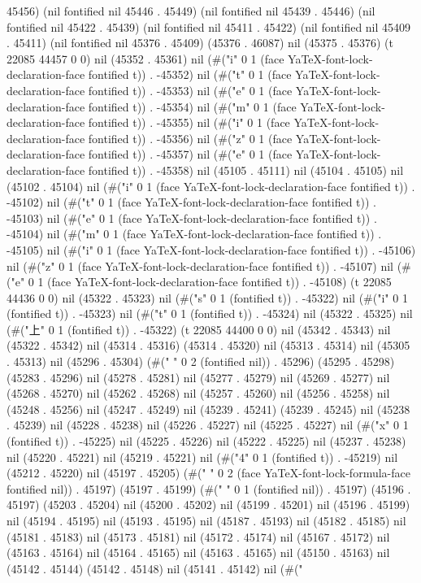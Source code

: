 45456) (nil fontified nil 45446 . 45449) (nil fontified nil 45439 . 45446) (nil fontified nil 45422 . 45439) (nil fontified nil 45411 . 45422) (nil fontified nil 45409 . 45411) (nil fontified nil 45376 . 45409) (45376 . 46087) nil (45375 . 45376) (t 22085 44457 0 0) nil (45352 . 45361) nil (#("i" 0 1 (face YaTeX-font-lock-declaration-face fontified t)) . -45352) nil (#("t" 0 1 (face YaTeX-font-lock-declaration-face fontified t)) . -45353) nil (#("e" 0 1 (face YaTeX-font-lock-declaration-face fontified t)) . -45354) nil (#("m" 0 1 (face YaTeX-font-lock-declaration-face fontified t)) . -45355) nil (#("i" 0 1 (face YaTeX-font-lock-declaration-face fontified t)) . -45356) nil (#("z" 0 1 (face YaTeX-font-lock-declaration-face fontified t)) . -45357) nil (#("e" 0 1 (face YaTeX-font-lock-declaration-face fontified t)) . -45358) nil (45105 . 45111) nil (45104 . 45105) nil (45102 . 45104) nil (#("i" 0 1 (face YaTeX-font-lock-declaration-face fontified t)) . -45102) nil (#("t" 0 1 (face YaTeX-font-lock-declaration-face fontified t)) . -45103) nil (#("e" 0 1 (face YaTeX-font-lock-declaration-face fontified t)) . -45104) nil (#("m" 0 1 (face YaTeX-font-lock-declaration-face fontified t)) . -45105) nil (#("i" 0 1 (face YaTeX-font-lock-declaration-face fontified t)) . -45106) nil (#("z" 0 1 (face YaTeX-font-lock-declaration-face fontified t)) . -45107) nil (#("e" 0 1 (face YaTeX-font-lock-declaration-face fontified t)) . -45108) (t 22085 44436 0 0) nil (45322 . 45323) nil (#("s" 0 1 (fontified t)) . -45322) nil (#("i" 0 1 (fontified t)) . -45323) nil (#("t" 0 1 (fontified t)) . -45324) nil (45322 . 45325) nil (#("上" 0 1 (fontified t)) . -45322) (t 22085 44400 0 0) nil (45342 . 45343) nil (45322 . 45342) nil (45314 . 45316) (45314 . 45320) nil (45313 . 45314) nil (45305 . 45313) nil (45296 . 45304) (#("  " 0 2 (fontified nil)) . 45296) (45295 . 45298) (45283 . 45296) nil (45278 . 45281) nil (45277 . 45279) nil (45269 . 45277) nil (45268 . 45270) nil (45262 . 45268) nil (45257 . 45260) nil (45256 . 45258) nil (45248 . 45256) nil (45247 . 45249) nil (45239 . 45241) (45239 . 45245) nil (45238 . 45239) nil (45228 . 45238) nil (45226 . 45227) nil (45225 . 45227) nil (#("x" 0 1 (fontified t)) . -45225) nil (45225 . 45226) nil (45222 . 45225) nil (45237 . 45238) nil (45220 . 45221) nil (45219 . 45221) nil (#("4" 0 1 (fontified t)) . -45219) nil (45212 . 45220) nil (45197 . 45205) (#("  " 0 2 (face YaTeX-font-lock-formula-face fontified nil)) . 45197) (45197 . 45199) (#(" " 0 1 (fontified nil)) . 45197) (45196 . 45197) (45203 . 45204) nil (45200 . 45202) nil (45199 . 45201) nil (45196 . 45199) nil (45194 . 45195) nil (45193 . 45195) nil (45187 . 45193) nil (45182 . 45185) nil (45181 . 45183) nil (45173 . 45181) nil (45172 . 45174) nil (45167 . 45172) nil (45163 . 45164) nil (45164 . 45165) nil (45163 . 45165) nil (45150 . 45163) nil (45142 . 45144) (45142 . 45148) nil (45141 . 45142) nil (#("
